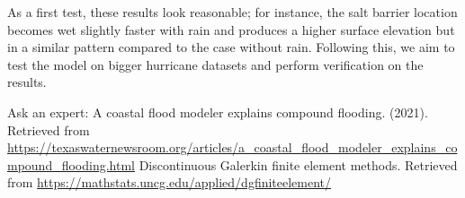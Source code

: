 \documentclass[american]{article}
\begin{document}
\begin{multicols}{3}
As a first test, these results look reasonable; for instance, the salt barrier location becomes wet slightly faster with rain and produces a higher surface elevation but in a similar pattern compared to the case without rain. Following this, we aim to test the model on bigger hurricane datasets and perform verification on the results.


\begin{thebibliography}{2}
  Ask an expert: A coastal flood modeler explains compound flooding. (2021). Retrieved from \url{https://texaswaternewsroom.org/articles/a_coastal_flood_modeler_explains_compound_flooding.html}
  Discontinuous Galerkin finite element methods. Retrieved from \url{https://mathstats.uncg.edu/applied/dgfiniteelement/}
\end{thebibliography}



\end{multicols}
\end{document}
